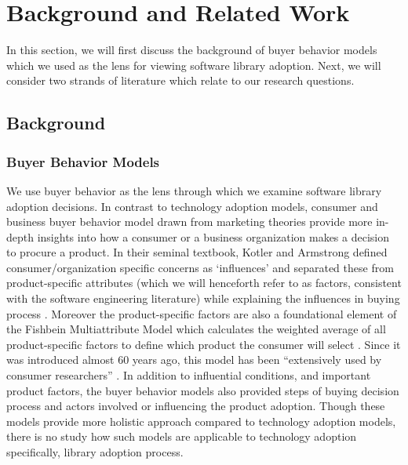 
\section{Background and Related Work}

In this section, we will first discuss the background of buyer behavior models which we used as the lens for viewing software library adoption. Next, we will consider two strands of literature which relate to our research questions. 



\subsection{Background}
\subsubsection{Buyer Behavior Models}
We use buyer behavior as the lens through which we examine software library adoption decisions.
In contrast to technology adoption models, consumer and business buyer behavior model drawn from marketing theories provide more in-depth insights into how a consumer or a business organization makes a decision to procure a product. In their seminal textbook, Kotler and Armstrong defined consumer/organization specific concerns as `influences' and  separated these from product-specific attributes (which we will henceforth refer to as factors, consistent with the software engineering literature) while explaining the influences in buying process \cite{kotler2014principles}. Moreover the product-specific factors are also a foundational element of the Fishbein Multiattribute Model which calculates the weighted average of all product-specific factors to define which product the consumer will select \cite{fishbein1967attitude}. Since it was introduced almost 60 years ago, this model has been ``extensively used by consumer researchers'' \cite{blackwell2001consumer}. %
In addition to influential conditions, and important product factors, the buyer behavior models also provided steps of buying decision process and actors involved or influencing the product adoption. Though these models provide more holistic approach compared to technology adoption models, there is no study how such models are applicable to technology adoption specifically, library adoption process.

